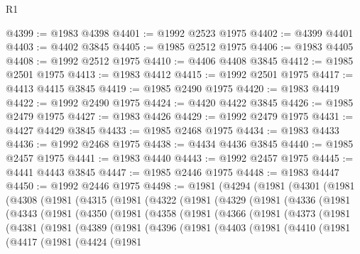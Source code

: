 \begin{lexlean}{R1}
\begin{coremodule}
@4399 := @1983 @4398
@4401 := @1992 @2523 @1975
@4402 := @4399 @4401
@4403 := @4402 @3845
@4405 := @1985 @2512 @1975
@4406 := @1983 @4405
@4408 := @1992 @2512 @1975
@4410 := @4406 @4408 @3845
@4412 := @1985 @2501 @1975
@4413 := @1983 @4412
@4415 := @1992 @2501 @1975
@4417 := @4413 @4415 @3845
@4419 := @1985 @2490 @1975
@4420 := @1983 @4419
@4422 := @1992 @2490 @1975
@4424 := @4420 @4422 @3845
@4426 := @1985 @2479 @1975
@4427 := @1983 @4426
@4429 := @1992 @2479 @1975
@4431 := @4427 @4429 @3845
@4433 := @1985 @2468 @1975
@4434 := @1983 @4433
@4436 := @1992 @2468 @1975
@4438 := @4434 @4436 @3845
@4440 := @1985 @2457 @1975
@4441 := @1983 @4440
@4443 := @1992 @2457 @1975
@4445 := @4441 @4443 @3845
@4447 := @1985 @2446 @1975
@4448 := @1983 @4447
@4450 := @1992 @2446 @1975
@4498 := @1981
    (@4294
      (@1981
        (@4301
          (@1981
            (@4308
              (@1981
                (@4315
                  (@1981
                    (@4322
                      (@1981
                        (@4329
                          (@1981
                            (@4336
                              (@1981
                                (@4343
                                  (@1981
                                    (@4350
                                      (@1981
                                        (@4358
                                          (@1981
                                            (@4366
                                              (@1981
                                                (@4373
                                                  (@1981
                                                    (@4381
                                                      (@1981
                                                        (@4389
                                                          (@1981
                                                            (@4396
                                                              (@1981
                                                                (@4403
                                                                  (@1981
                                                                    (@4410
                                                                      (@1981
                                                                        (@4417
                                                                          (@1981
                                                                            (@4424
                                                                              (@1981

\end{coremodule}
\end{lexlean}
